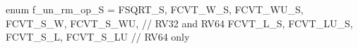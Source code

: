 enum f_un_rm_op_S = {FSQRT_S, FCVT_W_S, FCVT_WU_S, FCVT_S_W, FCVT_S_WU,    // RV32 and RV64
                     FCVT_L_S, FCVT_LU_S, FCVT_S_L, FCVT_S_LU}             // RV64 only
